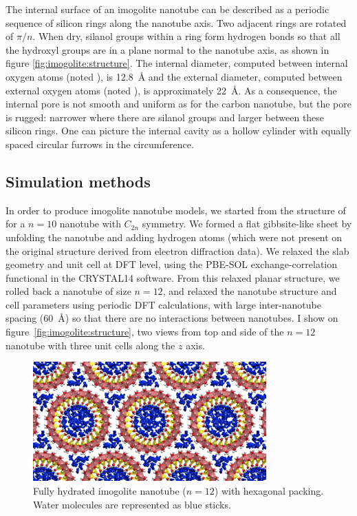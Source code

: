 \documentclass[thesis]{subfiles}
\begin{document}
The internal surface of an imogolite nanotube can be described as a periodic
sequence of silicon rings along the nanotube axis. Two adjacent rings are
rotated of $\pi / n$. When dry, silanol groups within a ring form hydrogen bonds
so that all the hydroxyl groups are in a plane normal to the nanotube axis, as
shown in figure \ref{fig:imogolite:structure}. The internal diameter, computed
between internal oxygen atoms (noted ), is \SI{12.8}{\AA} and the
external diameter, computed between external oxygen atoms (noted ),
is approximately \SI{22}{\AA}. As a consequence, the internal pore is not smooth
and uniform as for the carbon nanotube, but the pore is rugged: narrower where
there are silanol groups and larger between these silicon rings. One can picture
the internal cavity as a hollow cylinder with equally spaced circular furrows in
the circumference.

\subsection{Simulation methods}

In order to produce imogolite nanotube models, we started from the structure of
\citeauthor{Cradwick1972}\cite{Cradwick1972} for a $n=10$ nanotube with $C_{2n}$
symmetry. We formed a flat gibbsite-like sheet by unfolding the nanotube and
adding hydrogen atoms (which were not present on the original structure derived
from electron diffraction data). We relaxed the slab geometry and unit cell at
DFT level, using the PBE-SOL exchange-correlation functional\cite{Perdew2008} in
the CRYSTAL14 software\cite{Dovesi2014}. From this relaxed planar structure, we
rolled back a nanotube of size $n=12$, and relaxed the nanotube structure and
cell parameters using periodic DFT calculations, with large inter-nanotube
spacing (\SI{60}{\AA}) so that there are no interactions between nanotubes. I
show on figure~\ref{fig:imogolite:structure}, two views from top and side of the
$n=12$ nanotube with three unit cells along the $z$ axis.

\begin{figure}[t]
	\centering
	\includegraphics[width=0.8\textwidth]{figures/images/imogolite-gcmc-result}
	\caption{Fully hydrated imogolite nanotube ($n=12$) with hexagonal packing.
    Water molecules are represented as blue sticks.}
    \label{fig:imogolite:gcmc-result}
\end{figure}
\end{document}
